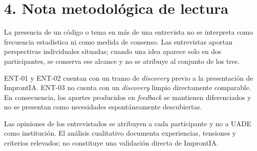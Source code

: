 \section*{4. Nota metodológica de lectura}
La presencia de un código o tema en más de una entrevista no se interpreta como frecuencia estadística ni como medida de consenso. Las entrevistas aportan perspectivas individuales situadas; cuando una idea aparece solo en dos participantes, se conserva ese alcance y no se atribuye al conjunto de los tres.

ENT-01 y ENT-02 cuentan con un tramo de \textit{discovery} previo a la presentación de ImprontIA. ENT-03 no cuenta con un \textit{discovery} limpio directamente comparable. En consecuencia, los aportes producidos en \textit{feedback} se mantienen diferenciados y no se presentan como necesidades espontáneamente descubiertas.

Las opiniones de los entrevistados se atribuyen a cada participante y no a UADE como institución. El análisis cualitativo documenta experiencias, tensiones y criterios relevados; no constituye una validación directa de ImprontIA.
